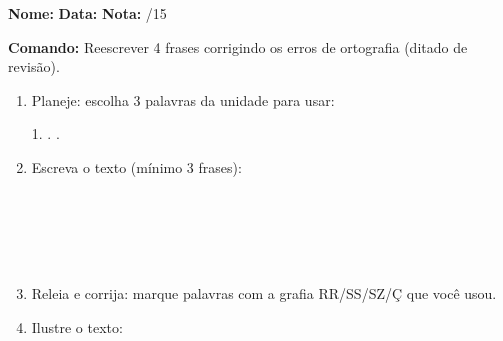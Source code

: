 

\begin{exercicio}

\noindent\textbf{Nome:} \underline{\hspace{3.2cm}} \quad \textbf{Data:} \underline{\hspace{1.6cm}} \quad \textbf{Nota:} \underline{\hspace{0.9cm}}/15


\noindent\textbf{Comando:} Reescrever 4 frases corrigindo os erros de ortografia (ditado de revisão).


\begin{enumerate}

  \item Planeje: escolha 3 palavras da unidade para usar:
  \begin{center}
  1. \underline{\hspace{3cm}} . \underline{\hspace{3cm}} . \underline{\hspace{3cm}}
  \end{center}

  \item Escreva o texto (mínimo 3 frases):
  \begin{center}
  \underline{\hspace{12cm}}\\\underline{\hspace{12cm}}\\\underline{\hspace{12cm}}\\\underline{\hspace{12cm}}\\\underline{\hspace{12cm}}
  \end{center}

  \item Releia e corrija: marque palavras com a grafia RR/SS/SZ/Ç que você usou.

  \item Ilustre o texto:
  \begin{center}
  \end{center}

\end{enumerate}

\end{exercicio}

